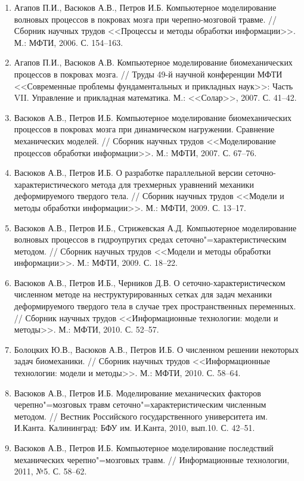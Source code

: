 \begin{enumerate}
\item Агапов П.И., Васюков А.В., Петров И.Б. Компьютерное моделирование волновых процессов в покровах мозга при черепно-мозговой травме. // Сборник научных трудов <<Процессы и методы обработки информации>>. М.: МФТИ, 2006. С. 154--163.
\item Агапов П.И., Васюков А.В. Компьютерное моделирование биомеханических процессов в покровах мозга. // Труды 49-й научной конференции МФТИ <<Современные проблемы фундаментальных и прикладных наук>>: Часть VII. Управление и прикладная математика. М.: <<Солар>>, 2007. С. 41--42.
\item Васюков А.В., Петров И.Б. Компьютерное моделирование биомеханических процессов в покровах мозга при динамическом нагружении. Сравнение механических моделей. // Сборник научных трудов <<Моделирование процессов обработки информации>>. М.: МФТИ, 2007. С. 67--76.
\item Васюков А.В., Петров И.Б. О разработке параллельной версии сеточно-характеристического метода для трехмерных уравнений механики деформируемого твердого тела. // Сборник научных трудов <<Модели и методы обработки информации>>. М.: МФТИ, 2009. С. 13--17.
\item Васюков А.В., Петров И.Б., Стрижевская А.Д. Компьютерное моделирование волновых процессов в гидроупругих средах сеточно"=характеристическим методом. // Сборник научных трудов <<Модели и методы обработки информации>>. М.: МФТИ, 2009. С. 18--22.
\item Васюков А.В., Петров И.Б., Черников Д.В. О сеточно-характеристическом численном методе на неструктурированных сетках для задач механики деформируемого твердого тела в случае трех пространственных переменных. // Сборник научных трудов <<Информационные технологии: модели и методы>>. М.: МФТИ, 2010. С. 52--57.
\item Болоцких Ю.В., Васюков А.В., Петров И.Б. О численном решении некоторых задач биомеханики. // Сборник научных трудов <<Информационные технологии: модели и методы>>. М.: МФТИ, 2010. С. 58--64.
\item Васюков А.В., Петров И.Б. Моделирование механических факторов черепно"=мозговых травм сеточно"=характеристическим численным методом. // Вестник Российского государственного университета им. И.Канта. Калининград: БФУ им. И.Канта, 2010, вып.10. С. 42--51.
\item Васюков А.В., Петров И.Б. Компьютерное моделирование последствий механических черепно"=мозговых травм. // Информационные технологии, 2011, №5. С. 58--62.

\end{enumerate}
